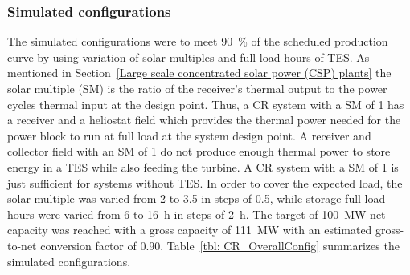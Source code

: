 \subsubsection{Simulated configurations}
The simulated configurations were to meet 90~\% of the scheduled production curve by using variation of solar multiples and full load hours of TES. As mentioned in Section~\ref{Large scale concentrated solar power (CSP) plants} the solar multiple (SM) is the ratio of the receiver's thermal output to the power cycles thermal input at the design point. Thus, a CR system with a SM of 1 has a receiver and a heliostat field which provides the thermal power needed for the power block to run at full load at the system design point. A receiver and collector field with an SM of 1 do not produce enough thermal power to store energy in a TES while also feeding the turbine. A CR system with a SM of 1 is just sufficient for systems without TES. In order to cover the expected load, the solar multiple was varied from 2 to 3.5 in steps of 0.5, while storage full load hours were varied from 6 to 16~h in steps of 2~h. The target of \SI{100}{MW} net capacity was reached with a gross capacity of 111~MW with an estimated gross-to-net conversion factor of 0.90. Table~\ref{tbl: CR_OverallConfig} summarizes the simulated configurations.

